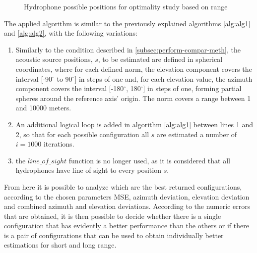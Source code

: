 \begin{figure}[!htb]
	\captionsetup{justification=centering,margin=2cm}
	\caption{Hydrophone possible positions for optimality study based on range}
	\label{fig:24h-config}
\end{figure}

The applied algorithm is similar to the previously explained algorithms \ref{alg:alg1} and \ref{alg:alg2}, with the following variations:

\begin{enumerate}
	\item Similarly to the condition described in \ref{subsec:perform-compar-meth}, the acoustic source positions, $s$, to be estimated are defined in spherical coordinates, where for each defined norm, the elevation component covers the interval [-90$^{\circ}$ to 90$^{\circ}$] in steps of one and, for each elevation value, the azimuth component covers the interval [-180$^{\circ}$, 180$^{\circ}$] in steps of one, forming partial spheres around the reference axis' origin. The norm covers a range between 1 and 10000 meters.
	
	\item An additional logical loop is added in algorithm \ref{alg:alg1} between lines 1 and 2, so that for each possible configuration all $s$ are estimated a number of $i = 1000$ iterations.
	
	\item the $line\_of\_sight$ function is no longer used, as it is considered that all hydrophones have line of sight to every position $s$.
\end{enumerate}

From here it is possible to analyze which are the best returned configurations, according to the chosen parameters MSE, azimuth deviation, elevation deviation and combined azimuth and elevation deviations. According to the numeric errors that are obtained, it is then possible to decide whether there is a single configuration that has evidently a better performance than the others or if there is a pair of configurations that can be used to obtain individually better estimations for short and long range.

